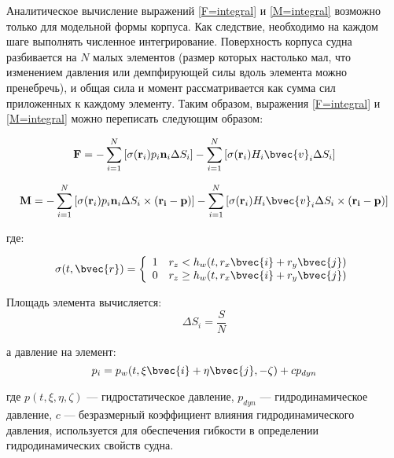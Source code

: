 Аналитическое вычисление выражений \eqref{F=integral} и \eqref{M=integral} возможно только для модельной формы корпуса. Как следствие, необходимо на каждом шаге выполнять численное интегрирование. Поверхность корпуса судна разбивается на $N$ малых элементов (размер которых настолько мал, что изменением давления или демпфирующей силы вдоль элемента можно пренебречь), и общая сила и момент рассматривается как сумма сил приложенных к каждому элементу. Таким образом, выражения \eqref{F=integral} и \eqref{M=integral} можно переписать следующим образом:

\begin{equation}
	\mathbf{F} = 
		-\sum_{i=1}^{N} \left[
			\sigma (\mathbf{r}_i) p_i \mathbf{n}_i \Delta S_i
		\right]
		-\sum_{i=1}^{N} \left[
			\sigma (\mathbf{r}_i) H_i \bvec{v}_i \Delta S_i
		\right]
\end{equation}

\begin{equation}
	\mathbf{M} = 
		-\sum_{i=1}^{N} \left[
			\sigma (\mathbf{r}_i) p_i \mathbf{n}_i \Delta S_i \times (\mathbf{r_i} - \mathbf{p})
		\right]
		-\sum_{i=1}^{N} \left[
			\sigma (\mathbf{r}_i) H_i \bvec{v}_i \Delta S_i \times (\mathbf{r_i} - \mathbf{p})
		\right]
\end{equation}

где:

\begin{equation}
  \sigma(t,\bvec{r}) = \left\{
  \begin{array}{l l}
    1 & r_z		< 		h_w (t, r_x \bvec{i} + r_y \bvec{j}) \\
    0 & r_z		\geq 	h_w (t, r_x \bvec{i} + r_y \bvec{j}) \\
  \end{array} \right.
\end{equation}

Площадь элемента вычисляется:
\begin{equation}
	\Delta S_i = \frac{S}{N}
\end{equation}

а давление на элемент:
\begin{equation}
	p_i = p_w(t, \xi \bvec{i} + \eta \bvec{j}, -\zeta) + c p_{dyn}
\end{equation}

где $p(t, \xi, \eta, \zeta)$ --- гидростатическое давление, $p_{dyn}$ --- гидродинамическое давление, $c$ --- безразмерный коэффициент влияния гидродинамического давления, используется для обеспечения гибкости в определении гидродинамических свойств судна.

